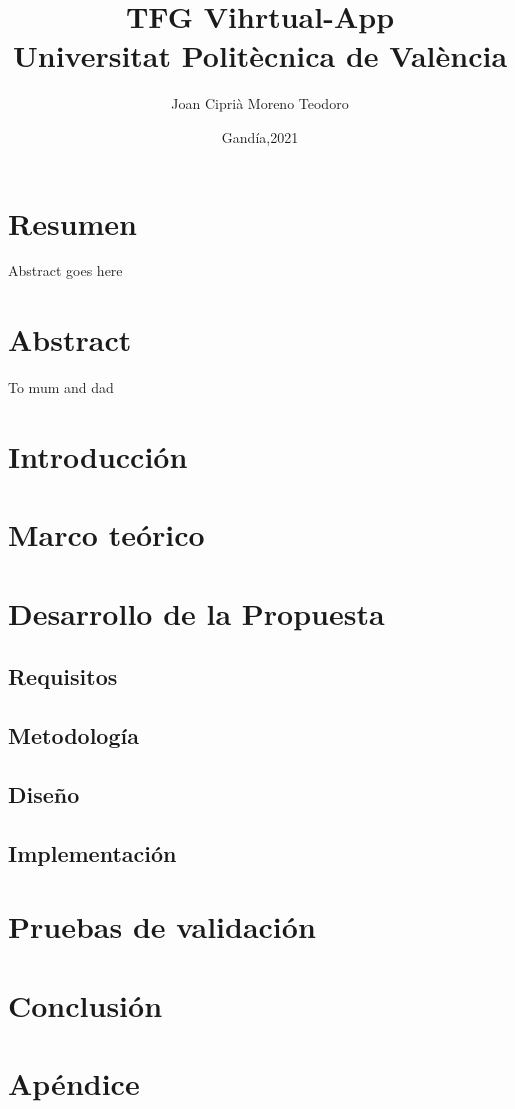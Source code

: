 \documentclass[11pt]{book}
\title{
{TFG Vihrtual-App}\\
{\large Universitat Politècnica de València}\\
}
\author{Joan Ciprià Moreno Teodoro}
\date{Gandía,2021}
\begin{document}
\maketitle

\chapter*{Resumen}
Abstract goes here

\chapter*{Abstract}
To mum and dad

\tableofcontents

\chapter{Introducción}


\chapter{Marco teórico}


\chapter{Desarrollo de la Propuesta}

\section{Requisitos}


\section{Metodología}


\section{Diseño}


\section{Implementación}


\chapter{Pruebas de validación}


\chapter{Conclusión}


\appendix
\chapter{Apéndice}

\end{document}
